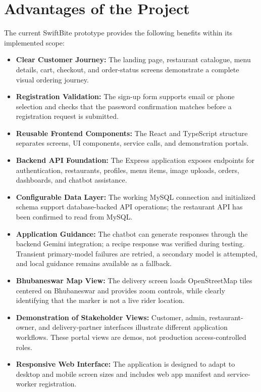\chapter{Advantages of the Project}

The current SwiftBite prototype provides the following benefits within its implemented scope:

\begin{itemize}

\item \textbf{Clear Customer Journey:}
The landing page, restaurant catalogue, menu details, cart, checkout, and order-status screens demonstrate a complete visual ordering journey.

\item \textbf{Registration Validation:}
The sign-up form supports email or phone selection and checks that the password confirmation matches before a registration request is submitted.

\item \textbf{Reusable Frontend Components:}
The React and TypeScript structure separates screens, UI components, service calls, and demonstration portals.

\item \textbf{Backend API Foundation:}
The Express application exposes endpoints for authentication, restaurants, profiles, menu items, image uploads, orders, dashboards, and chatbot assistance.

\item \textbf{Configurable Data Layer:}
The working MySQL connection and initialized schema support database-backed API operations; the restaurant API has been confirmed to read from MySQL.

\item \textbf{Application Guidance:}
The chatbot can generate responses through the backend Gemini integration; a recipe response was verified during testing. Transient primary-model failures are retried, a secondary model is attempted, and local guidance remains available as a fallback.

\item \textbf{Bhubaneswar Map View:}
The delivery screen loads OpenStreetMap tiles centered on Bhubaneswar and provides zoom controls, while clearly identifying that the marker is not a live rider location.

\item \textbf{Demonstration of Stakeholder Views:}
Customer, admin, restaurant-owner, and delivery-partner interfaces illustrate different application workflows. These portal views are demos, not production access-controlled roles.

\item \textbf{Responsive Web Interface:}
The application is designed to adapt to desktop and mobile screen sizes and includes web app manifest and service-worker registration.

\end{itemize}
